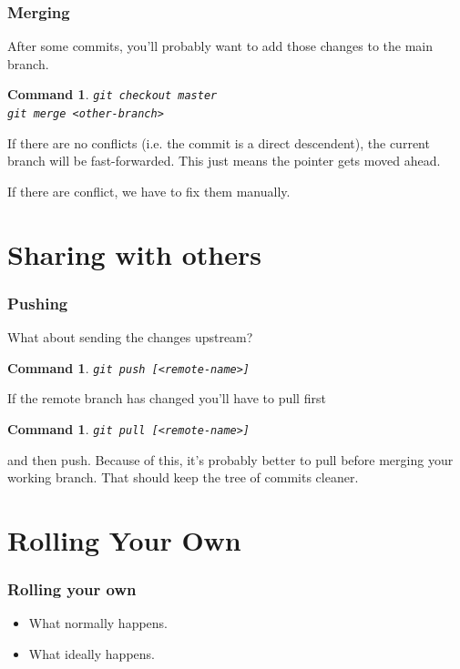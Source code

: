 \documentclass{beamer}
\newtheorem{command}[theorem]{Command}
\begin{document}
\begin{frame}
    \frametitle{Merging}
    After some commits, you'll probably want to add those changes to the main branch.
    \begin{command}
        \texttt{git checkout master \\ git merge <other-branch>}
    \end{command}
    If there are no conflicts (i.e. the commit is a direct descendent), the current branch will be fast-forwarded. This just means the pointer gets moved ahead.

    If there are conflict, we have to fix them manually.
\end{frame}

\section{Sharing with others}

\begin{frame}
    \frametitle{Pushing}
    What about sending the changes upstream?
    \begin{command}
        \texttt{git push [<remote-name>]}
    \end{command}
    \pause
    If the remote branch has changed you'll have to pull first
    \begin{command}
        \texttt{git pull [<remote-name>]}
    \end{command}
    and then push.
    \pause
    Because of this, it's probably better to pull before merging your working branch. That should keep the tree of commits cleaner.
\end{frame}


\section{Rolling Your Own}

\begin{frame}
    \frametitle{Rolling your own}
    \begin{itemize}
        \item What normally happens.
        \item What ideally happens.
    \end{itemize}
\end{frame}
\end{document}
